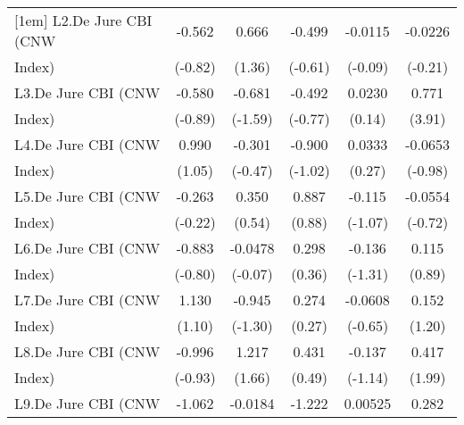 {\begin{tabular}{l*{5}{c}}
[1em]
L2.De Jure CBI (CNW &      -0.562         &       0.666         &      -0.499         &     -0.0115         &     -0.0226         \\
Index)              &     (-0.82)         &      (1.36)         &     (-0.61)         &     (-0.09)         &     (-0.21)         \\
[1em]
L3.De Jure CBI (CNW &      -0.580         &      -0.681         &      -0.492         &      0.0230         &       0.771\sym{***}\\
Index)              &     (-0.89)         &     (-1.59)         &     (-0.77)         &      (0.14)         &      (3.91)         \\
[1em]
L4.De Jure CBI (CNW &       0.990         &      -0.301         &      -0.900         &      0.0333         &     -0.0653         \\
Index)              &      (1.05)         &     (-0.47)         &     (-1.02)         &      (0.27)         &     (-0.98)         \\
[1em]
L5.De Jure CBI (CNW &      -0.263         &       0.350         &       0.887         &      -0.115         &     -0.0554         \\
Index)              &     (-0.22)         &      (0.54)         &      (0.88)         &     (-1.07)         &     (-0.72)         \\
[1em]
L6.De Jure CBI (CNW &      -0.883         &     -0.0478         &       0.298         &      -0.136         &       0.115         \\
Index)              &     (-0.80)         &     (-0.07)         &      (0.36)         &     (-1.31)         &      (0.89)         \\
[1em]
L7.De Jure CBI (CNW &       1.130         &      -0.945         &       0.274         &     -0.0608         &       0.152         \\
Index)              &      (1.10)         &     (-1.30)         &      (0.27)         &     (-0.65)         &      (1.20)         \\
[1em]
L8.De Jure CBI (CNW &      -0.996         &       1.217         &       0.431         &      -0.137         &       0.417\sym{*}  \\
Index)              &     (-0.93)         &      (1.66)         &      (0.49)         &     (-1.14)         &      (1.99)         \\
[1em]
L9.De Jure CBI (CNW &      -1.062         &     -0.0184         &      -1.222         &     0.00525         &       0.282         \\

\end{tabular}}
